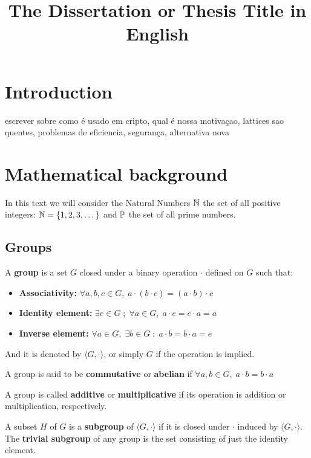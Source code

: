 \documentclass[Ingles]{ic-tese-v3}
\date{}
\title{}
\begin{document}
\title{The Dissertation or Thesis Title in English}
\mestrado
{}
\paginasiniciais


\chapter{Introduction}
\label{sec:orga62b0cc}
escrever sobre como é usado em cripto, qual é nossa motivaçao, lattices sao quentes, problemas de eficiencia, segurança, alternativa nova
\chapter{Mathematical background}
\label{sec:org024c52f}
In this text we will consider the Natural Numbers \(\N\) the set of all positive integers: \(\N = \{1,2,3,\dots\}\) and \(\P\) the set of all prime numbers. 
\section{Groups}
\label{sec:org3a42cb3}

\begin{definition}
  A \textbf{group} is a set $G$ closed under a binary operation $\cdot$ defined on $G$ such
  that:
  \begin{itemize}
  \item \textbf{Associativity: } $\forall a,b,c \in G, \; a\cdot(b\cdot c) = (a\cdot b)\cdot c$
  \item \textbf{Identity element: } $\exists e \in G \; ; \; \forall a \in G, \; a\cdot e = e\cdot a = a$
  \item \textbf{Inverse element: } $\forall a \in G, \; \exists b \in G \; ; \; a\cdot b = b \cdot a = e$
  \end{itemize}
And it is denoted by $\langle G,\cdot\rangle$, or simply $G$ if the operation is implied.
\end{definition}

\begin{definition}
  A group is said to be \textbf{commutative} or \textbf{abelian}
  if $\forall a, b \in G, \; a\cdot b = b\cdot a$
\end{definition}

\noindent
A group is called \textbf{additive} or \textbf{multiplicative} if its
operation is addition or multiplication, respectively.

\begin{definition}
  A subset $H$ of $G$ is a \textbf{subgroup} of $\langle G,\cdot \rangle$ if it is
  closed under $\cdot$ induced by $\langle G,\cdot \rangle$. The \textbf{trivial subgroup} of any
  group is the set consisting of just the identity element.
\end{definition}
\end{document}
